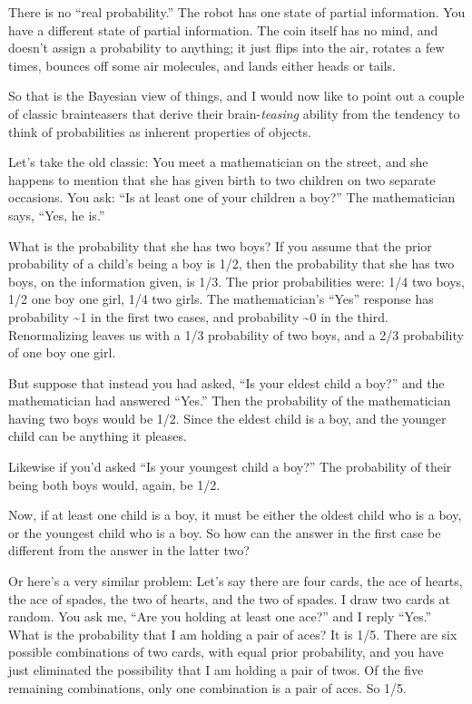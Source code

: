 {
 There is no ``real
probability.'' The robot has one state of partial
information. You have a different state of partial information. The
coin itself has no mind, and doesn't assign a
probability to anything; it just flips into the air, rotates a few
times, bounces off some air molecules, and lands either heads or
tails.}

{
 So that is the Bayesian view of things, and I would now like to
point out a couple of classic brainteasers that derive their
brain-\textit{teasing} ability from the tendency to think of
probabilities as inherent properties of objects.}

{
 Let's take the old classic: You meet a
mathematician on the street, and she happens to mention that she has
given birth to two children on two separate occasions. You ask:
``Is at least one of your children a
boy?'' The mathematician says,
``Yes, he is.''}

{
 What is the probability that she has two boys? If you assume that
the prior probability of a child's being a boy is 1/2,
then the probability that she has two boys, on the information given,
is 1/3. The prior probabilities were: 1/4 two boys, 1/2 one boy one
girl, 1/4 two girls. The mathematician's
``Yes'' response has probability
\~{}1 in the first two cases, and probability \~{}0 in the third.
Renormalizing leaves us with a 1/3 probability of two boys, and a 2/3
probability of one boy one girl.}

{
 But suppose that instead you had asked, ``Is your
eldest child a boy?'' and the mathematician had
answered ``Yes.'' Then the
probability of the mathematician having two boys would be 1/2. Since
the eldest child is a boy, and the younger child can be anything it
pleases.}

{
 Likewise if you'd asked ``Is your
youngest child a boy?'' The probability of their
being both boys would, again, be 1/2.}

{
 Now, if at least one child is a boy, it must be either the oldest
child who is a boy, or the youngest child who is a boy. So how can the
answer in the first case be different from the answer in the latter
two?}

{
 Or here's a very similar problem:
Let's say there are four cards, the ace of hearts, the ace
of spades, the two of hearts, and the two of spades. I draw two cards
at random. You ask me, ``Are you holding at least one
ace?'' and I reply
``Yes.'' What is the probability
that I am holding a pair of aces? It is 1/5. There are six possible
combinations of two cards, with equal prior probability, and you have
just eliminated the possibility that I am holding a pair of twos. Of
the five remaining combinations, only one combination is a pair of
aces. So 1/5.}

